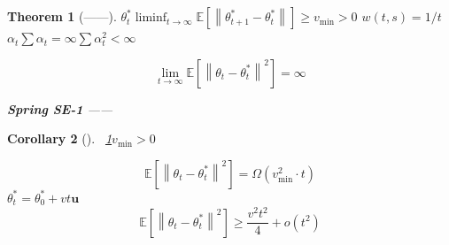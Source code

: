 \documentclass[11pt,a4paper]{article}
\newtheorem{theorem}{Theorem}[section]
\newtheorem{corollary}[theorem]{Corollary}
\theoremstyle{remark}
\newcommand{\E}{\mathbb{E}}
\newcommand{\norm}[1]{\left\lVert#1\right\rVert}
\begin{document}
\section{}

\subsection{}

\begin{theorem}[——]\label{thm:necessity}
$\theta_t^*$$\liminf_{t \to \infty} \E[\norm{\theta_{t+1}^* - \theta_t^*}] \geq v_{\min} > 0$
$w(t, s) = 1/t$
$\alpha_t$$\sum \alpha_t = \infty$$\sum \alpha_t^2 < \infty$

\begin{equation}
    \boxed{
    \lim_{t \to \infty} \E[\norm{\theta_t - \theta_t^*}^2] = \infty
    }
\end{equation}

\textbf{Spring SE-1}
——\textbf{}
\end{theorem}

\begin{corollary}[]\label{cor:divergence_rate}
~\ref{thm:necessity}$v_{\min} > 0$

\begin{equation}
    \E[\norm{\theta_t - \theta_t^*}^2] = \Omega(v_{\min}^2 \cdot t)
\end{equation}
$\theta_t^* = \theta_0^* + v t \mathbf{u}$
\begin{equation}
    \E[\norm{\theta_t - \theta_t^*}^2] \geq \frac{v^2 t^2}{4} + o(t^2)
\end{equation}
\end{corollary}

\subsection{}
\end{document}

